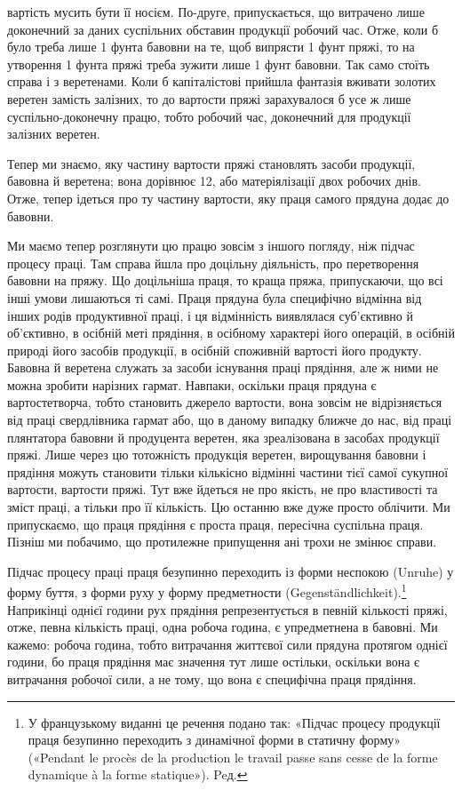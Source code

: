 \parcont{}  %
вартість мусить бути її носієм. По-друге, припускається, що витрачено
лише доконечний за даних суспільних обставин продукції
робочий час. Отже, коли б було треба лише 1 фунта бавовни
на те, щоб випрясти 1 фунт пряжі, то на утворення 1 фунта пряжі
треба зужити лише 1 фунт бавовни. Так само стоїть справа і з
веретенами. Коли б капіталістові прийшла фантазія вживати
золотих веретен замість залізних, то до вартости пряжі зарахувалося
б усе ж лише суспільно-доконечну працю, тобто робочий
час, доконечний для продукції залізних веретен.

Тепер ми знаємо, яку частину вартости пряжі становлять
засоби продукції, бавовна й веретена; вона дорівнює 12,
або матеріялізації двох робочих днів. Отже, тепер ідеться про
ту частину вартости, яку праця самого прядуна додає до бавовни.

Ми маємо тепер розглянути цю працю зовсім з іншого погляду,
ніж підчас процесу праці. Там справа йшла про доцільну діяльність,
про перетворення бавовни на пряжу. Що доцільніша праця,
то краща пряжа, припускаючи, що всі інші умови лишаються
ті самі. Праця прядуна була специфічно відмінна від інших
родів продуктивної праці, і ця відмінність виявлялася суб’єктивно
й об’єктивно, в осібній меті прядіння, в осібному характері його
операцій, в осібній природі його засобів продукції, в осібній споживній
вартості його продукту. Бавовна й веретена служать
за засоби існування праці прядіння, але ж ними не можна зробити
нарізних гармат. Навпаки, оскільки праця прядуна є вартостетворча,
тобто становить джерело вартости, вона зовсім не відрізняється
від праці свердлівника гармат або, що в даному випадку
ближче до нас, від праці плянтатора бавовни й продуцента
веретен, яка зреалізована в засобах продукції пряжі. Лише через
цю тотожність продукція веретен, вирощування бавовни і прядіння
можуть становити тільки кількісно відмінні частини тієї
самої сукупної вартости, вартости пряжі. Тут вже йдеться не
про якість, не про властивості та зміст праці, а тільки про її
кількість. Цю останню вже дуже просто облічити. Ми припускаємо,
що праця прядіння є проста праця, пересічна суспільна
праця. Пізніш ми побачимо, що протилежне припущення ані
трохи не змінює справи.

Підчас процесу праці праця безупинно переходить із форми
неспокою (Unruhe) у форму буття, з форми руху у форму предметности
(\textgerman{Gegenständlichkeit}).\footnote*{
У французькому виданні це речення подано так: «Підчас
процесу продукції праця безупинно переходить з динамічної форми в статичну
форму» («Pendant le procès de la production le travail passe sans
cesse de la forme dynamique à la forme statique»). Peд.
} Наприкінці однієї години рух
прядіння репрезентується в певній кількості пряжі, отже, певна
кількість праці, одна робоча година, є упредметнена в бавовні.
Ми кажемо: робоча година, тобто витрачання життєвої сили прядуна
протягом однієї години, бо праця прядіння має значення
тут лише остільки, оскільки вона є витрачання робочої сили,
а не тому, що вона є специфічна праця прядіння.
